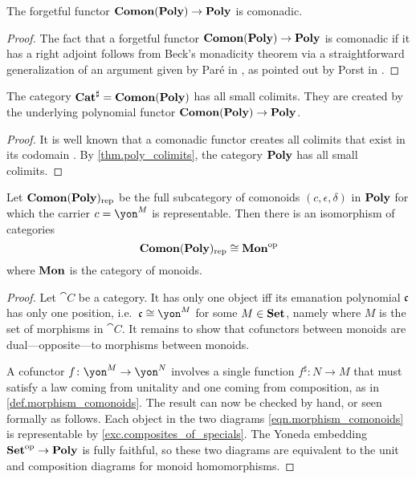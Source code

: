 \documentclass[Book-Poly]{subfiles}
\begin{document}
\begin{proposition}[Porst]
The forgetful functor $\mathbf{Comon}(\mathbf{Poly}) \to \mathbf{Poly}$ is comonadic.
\end{proposition}
\begin{proof}
The fact that a forgetful functor $\mathbf{Comon}(\mathbf{Poly}) \to \mathbf{Poly}$ is comonadic if it has a right adjoint follows from Beck's monadicity theorem via a straightforward generalization of an argument given by Par{\'e} in \cite[pp.~138-9]{pare1969absolute}, as pointed out by Porst in \cite[Fact~3.1]{porst2019colimits}.
\end{proof}

\begin{corollary}
The category $\mathbf{Cat}^\sharp = \mathbf{Comon}(\mathbf{Poly})$ has all small colimits.
They are created by the underlying polynomial functor $\mathbf{Comon}(\mathbf{Poly}) \to \mathbf{Poly}$.
\end{corollary}
\begin{proof}
It is well known that a comonadic functor creates all colimits that exist in its codomain \cite{nlab:created-limit}.
By \cref{thm.poly_colimits}, the category $\mathbf{Poly}$ has all small colimits.
\end{proof}

\begin{proposition}
Let $\mathbf{Comon}(\mathbf{Poly})_{\text{rep}}$ be the full subcategory of comonoids $(c,\epsilon,\delta)$ in $\mathbf{Poly}$ for which the carrier $c=\yon^M$ is representable. Then there is an isomorphism of categories
\[
\mathbf{Comon}(\mathbf{Poly})_{\text{rep}}\cong\mathbf{Mon}^{\textnormal{op}}
\]
where $\mathbf{Mon}$ is the category of monoids.
\end{proposition}
\begin{proof}
Let $\cat{C}$ be a category. It has only one object iff its emanation polynomial $\mathfrak{c}$ has only one position, i.e.\ $\ema{c}\cong\yon^M$ for some $M\in\mathbf{Set}$, namely where $M$ is the set of morphisms in $\cat{C}$. It remains to show that cofunctors between monoids are dual---opposite---to morphisms between monoids.

A cofunctor $f\colon\yon^M\to\yon^N$ involves a single function $f^\sharp\colon N\to M$ that must satisfy a law coming from unitality and one coming from composition, as in \cref{def.morphism_comonoids}. The result can now be checked by hand, or seen formally as follows. Each object in the two diagrams \eqref{eqn.morphism_comonoids} is representable by \cref{exc.composites_of_specials}. The Yoneda embedding $\mathbf{Set}^{\textnormal{op}}\to\mathbf{Poly}$ is fully faithful, so these two diagrams are equivalent to the unit and composition diagrams for monoid homomorphisms.
\end{proof}
\end{document}
